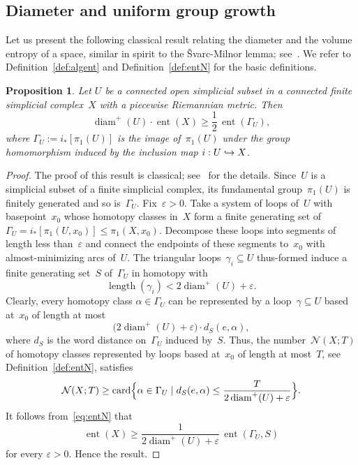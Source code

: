 \documentclass[JEP,XML,SOM,Unicode,NoFloatCountersInSection,published]{cedram}
\newcommand\hto{\mathrel{\lhook\joinrel\to}}
\DeclareMathOperator{\card}{card}
\newtheorem{proposition}[theorem]{Proposition}
\theoremstyle{definition}
\DeclareMathOperator\diam{diam}
\DeclareMathOperator{\ent}{ent}\let\eent\ent
\DeclareMathOperator{\length}{length}
\begin{document}
\subsection{Diameter and uniform group growth}

Let us present the following classical result relating the diameter and the volume entropy of a space, similar in spirit to the \v{S}varc-Milnor lemma; see~\cite[\S5.16]{gro99}.
We refer to Definition~\ref{def:algent} and Definition~\ref{def:entN} for the basic definitions.

\begin{proposition}\label{prop:diam-ent}
Let $U$ be a connected open simplicial subset in a connected finite simplicial complex~$X$ with a piecewise Riemannian metric.
Then
\[
\diam^+(U) \cdot \ent(X) \geq \frac{1}{2} \, \ent(\Gamma_U),
\]
where $\Gamma_U := i_*[\pi_1(U)]$ is the image of~$\pi_1(U)$ under the group homomorphism induced by the inclusion map $i:U \hto X$.
\end{proposition}

\begin{proof}
The proof of this result is classical; see~\cite[Prop.\,3.22]{gro99} for the details.
Since~$U$ is a simplicial subset of a finite simplicial complex, its fundamental group~$\pi_1(U)$ is finitely generated and so is~$\Gamma_U$.
Fix~$\varepsilon >0$.
Take a system of loops of~$U$ with basepoint~$x_0$ whose homotopy classes in~$X$ form a finite generating set of~$\Gamma_U = i_*[\pi_1(U,x_0)] \leqslant \pi_1(X,x_0)$.
Decompose these loops into segments of length less than~$\varepsilon$ and connect the endpoints of these segments to~$x_0$ with almost-minimizing arcs of~$U$.
The triangular loops~$\gamma_ i \subseteq U$ thus-formed induce a finite generating set~$S$ of~$\Gamma_U$ in homotopy with
\[
\length(\gamma_i) < 2 \diam^+(U) + \varepsilon.
\]
Clearly, every homotopy class $\alpha \in \Gamma_U$ can be represented by a loop~$\gamma \subseteq U$ based at~$x_0$ of length at most
\[
\bigl(2 \diam^+(U) + \varepsilon\bigr) \cdot d_S(e,\alpha),
\]
where $d_S$ is the word distance on~$\Gamma_U$ induced by~$S$.
Thus, the number~$\mathcal{N}(X;T)$ of homotopy classes represented by loops based at~$x_0$ of length at most~$T$, see Definition~\ref{def:entN}, satisfies
\[
\mathcal{N}(X;T) \geq \card \Bigl\{\alpha \in\Gamma_U \mid d_S(e,\alpha) \leq \frac{T}{2 \diam^+(U) + \varepsilon} \Bigr\}.
\]
It follows from~\eqref{eq:entN} that
\[
\eent(X) \geq \frac{1}{2 \diam^+(U) + \varepsilon} \, \ent(\Gamma_U,S)
\]
for every $\varepsilon >0$.
Hence the result.
\end{proof}
\end{document}
